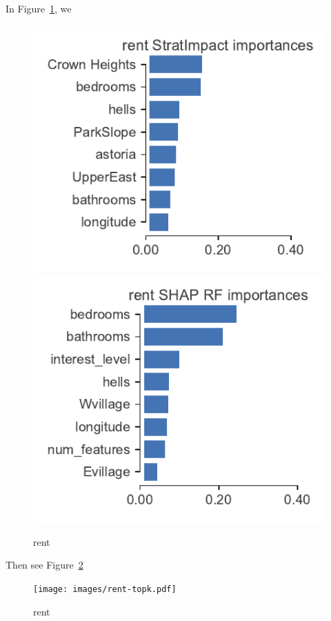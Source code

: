 \documentclass[12pt]{article}
\newcommand{\figref}[1]{Figure~\ref{#1}}
\begin{document}
In \figref{fig:rent-features}, we

\begin{figure}[htbp]
\begin{center}
\includegraphics[scale=0.6]{images/rent-features.pdf}
\includegraphics[scale=0.6]{images/rent-features-shap-rf.pdf}
\caption{rent}
\label{fig:rent-features}
\end{center}
\end{figure}

Then see \figref{fig:rent-topk}

\begin{figure}[htbp]
\begin{center}
\texttt{[image: images/rent-topk.pdf]}
\caption{rent}
\label{fig:rent-topk}
\end{center}
\end{figure}
\end{document}
